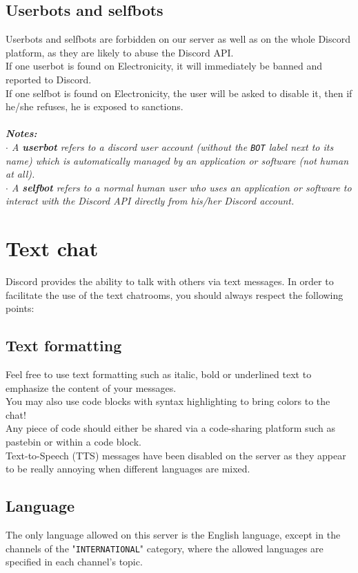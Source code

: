 \documentclass[a4paper]{article}
\begin{document}
\subsection{Userbots and selfbots}
Userbots and selfbots are forbidden on our server as well as on the whole Discord platform, as they are likely to abuse the Discord API.\\
If one userbot is found on Electronicity, it will immediately be banned and reported to Discord.\\
If one selfbot is found on Electronicity, the user will be asked to disable it, then if he/she refuses, he is exposed to sanctions.\\
\\
\textsl{{\small \textbf{Notes:}\\
$\cdot$ A \textbf{userbot} refers to a discord user account (without the \texttt{BOT} label next to its name) which is automatically managed by an application or software (not human at all).\\
$\cdot$ A \textbf{selfbot} refers to a normal human user who uses an application or software to interact with the Discord API directly from his/her Discord account.}}
\pagebreak

\section{Text chat}
Discord provides the ability to talk with others via text messages. In order to facilitate the use of the text chatrooms, you should always respect the following points:

\subsection{Text formatting}
Feel free to use text formatting such as italic, bold or underlined text to emphasize the content of your messages.\\
You may also use code blocks with syntax highlighting to bring colors to the chat!\\
Any piece of code should either be shared via a code-sharing platform such as pastebin or within a code block.\\
Text-to-Speech (TTS) messages have been disabled on the server as they appear to be really annoying when different languages are mixed.

\subsection{Language}
The only language allowed on this server is the English language, except in the channels of the "\texttt{INTERNATIONAL}" category, where the allowed languages are specified in each channel's topic.
\end{document}
